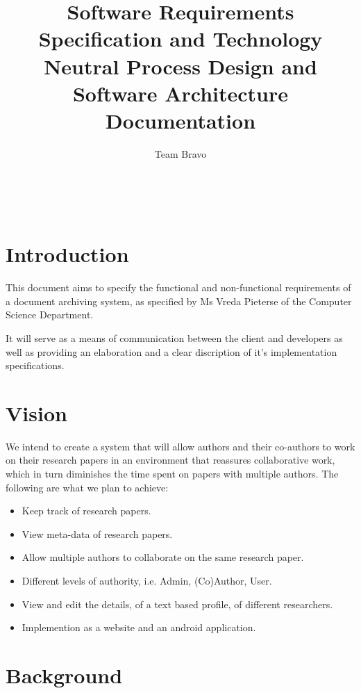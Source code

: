 \documentclass[11pt]{article}
\author{Team Bravo}
\title{Software Requirements Specification and Technology Neutral Process Design and Software Architecture Documentation}
\begin{document}
	\setlength{\parskip}{6pt}
	
	
	
	\renewcommand{\thesection}{\arabic{section}}
	\newpage
	
	\tableofcontents
	
	\textsc{}\\[1cm]
	
	\newpage
	
	\section{Introduction}
	
	This document aims to specify the functional and non-functional requirements of a document archiving system, as specified by Ms Vreda Pieterse of the Computer Science Department.
	
	It will serve as a means of communication between the client and developers as well as providing an elaboration and a clear discription of it's implementation specifications.
	
	\section{Vision}
	
	We intend to create a system that will allow authors and their co-authors to work on their research papers in an environment that reassures collaborative work, which in turn diminishes the time spent on papers with multiple authors. The following are what we plan to achieve:
	
	\begin{itemize}
		\item Keep track of research papers.
		\item View meta-data of research papers.
		\item Allow multiple authors to collaborate on the same research paper.
		\item Different levels of authority, i.e. Admin, (Co)Author, User.
		\item View and edit the details, of a text based profile, of different researchers.
		\item Implemention as a website and an android application.
	\end{itemize}
	
	\section{Background}
	
\end{document}
